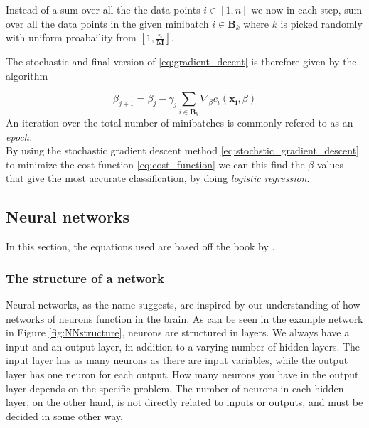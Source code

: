 Instead of a sum over all the the data points $i \in [1,n]$ we now in each step, sum over all the data points in the given minibatch $i \in \boldsymbol{B}_k$ where $k$ is picked randomly with uniform proabaility from $[1, \frac{n}{\boldsymbol{M}}]$.

The stochastic and final version of \eqref{eq:gradient_decent} is therefore given by the algorithm

\begin{equation}
    \beta_{j+1} = \beta_j - \gamma_j \sum_{i \in \boldsymbol{B}_k}\nabla_\beta c_i(\boldsymbol{x_i},\beta)
    \label{eq:stochstic_gradient_descent}
\end{equation}
An iteration over the total number of minibatches is commonly refered to as an \textit{epoch.}\\

By using the stochastic gradient descent method \eqref{eq:stochstic_gradient_descent} to minimize the cost function \eqref{eq:cost_function} we can this find the $\beta$ values that give the most accurate classification, by doing \textit{logistic regression}.

\subsection{Neural networks} 
In this section, the equations used are based off the book by \cite{Nielsen}.
\subsubsection*{The structure of a network}
Neural networks, as the name suggests, are inspired by our understanding of how networks of neurons function in the brain. As can be seen in the example network in Figure \ref{fig:NNstructure}, neurons are structured in layers. We always have a input and an output layer, in addition to a varying number of hidden layers. The input layer has as many neurons as there are input variables, while the output layer has one neuron for each output. How many neurons you have in the output layer depends on the specific problem. The number of neurons in each hidden layer, on the other hand, is not directly related to inputs or outputs, and must be decided in some other way.

